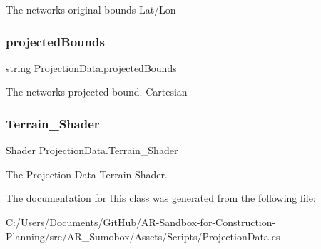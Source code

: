 The networks original bounds Lat/\+Lon 

\mbox{\label{class_projection_data_aa8e9a11cb798f79b76f73d508d5c4f99}} 
\subsubsection{\texorpdfstring{projectedBounds}{projectedBounds}}
{\footnotesize\ttfamily string Projection\+Data.\+projected\+Bounds}



The networks projected bound. Cartesian 

\mbox{\label{class_projection_data_ab853560889dd0c25033de418ab53b478}} 
\subsubsection{\texorpdfstring{Terrain\_Shader}{Terrain\_Shader}}
{\footnotesize\ttfamily Shader Projection\+Data.\+Terrain\+\_\+\+Shader}



The Projection Data Terrain Shader. 



The documentation for this class was generated from the following file\+:\begin{DoxyCompactItemize}
\item 
C\+:/\+Users/\+Documents/\+Git\+Hub/\+A\+R-\/\+Sandbox-\/for-\/\+Construction-\/\+Planning/src/\+A\+R\+\_\+\+Sumobox/\+Assets/\+Scripts/Projection\+Data.\+cs\end{DoxyCompactItemize}
